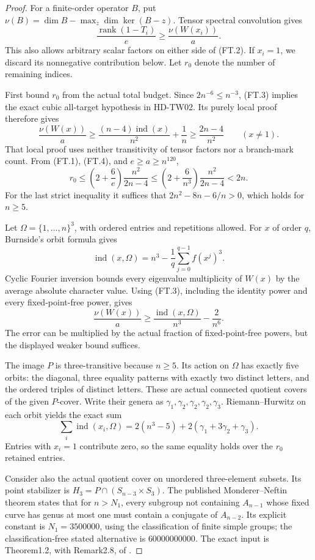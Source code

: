 \begin{proof}
For a finite-order operator \(B\), put
\(\nu(B)=\dim B-\max_z\dim\ker(B-z)\).
Tensor spectral convolution gives
\[
       \frac{\operatorname{rank}(1-T_i)}e
                   \ge\frac{\nu(W(x_i))}{a}.
       \tag{FT.4}
\]
This also allows arbitrary scalar factors on either side of (FT.2).
If \(x_i=1\), we discard its nonnegative contribution below.
Let \(r_0\) denote the number of remaining indices.

First bound \(r_0\) from the actual total budget.
Since \(2n^{-6}\le n^{-3}\), (FT.3) implies the exact cubic
all-target hypothesis in HD-TW02. Its purely local proof therefore gives
\[
 \frac{\nu(W(x))}{a}
 \ge \frac{(n-4)\operatorname{ind}(x)}{n^2}+\frac1n
 \ge \frac{2n-4}{n^2}
 \qquad(x\ne1).
 \tag{FT.5}
\]
That local proof uses neither transitivity of tensor factors nor a
branch-mark count. From (FT.1), (FT.4), and \(e\ge a\ge n^{120}\),
\[
 r_0\le
 \left(2+\frac6e\right)\frac{n^2}{2n-4}
 \le \left(2+\frac6{n^3}\right)\frac{n^2}{2n-4}<2n.
 \tag{FT.6}
\]
For the last strict inequality it suffices that
\(2n^2-8n-6/n>0\), which holds for \(n\ge5\).

Let \(\Omega=\{1,\ldots,n\}^3\), with ordered entries and repetitions
allowed. For \(x\) of order \(q\), Burnside's orbit formula gives
\[
 \operatorname{ind}(x,\Omega)
       =n^3-\frac1q\sum_{j=0}^{q-1}f(x^j)^3.
       \tag{FT.7}
\]
Cyclic Fourier inversion bounds every eigenvalue multiplicity of \(W(x)\)
by the average absolute character value. Using (FT.3), including the
identity power and every fixed-point-free power, gives
\[
 \frac{\nu(W(x))}{a}
    \ge\frac{\operatorname{ind}(x,\Omega)}{n^3}
                  -\frac2{n^6}.
 \tag{FT.8}
\]
The error can be multiplied by the actual fraction of fixed-point-free
powers, but the displayed weaker bound suffices.

The image \(P\) is three-transitive because \(n\ge5\).
Its action on \(\Omega\) has exactly five orbits: the diagonal,
three equality patterns with exactly two distinct letters, and
the ordered triples of distinct letters. These are actual connected
quotient covers of the given \(P\)-cover. Write their genera as
\(\gamma_1,\gamma_2,\gamma_2,\gamma_2,\gamma_3\).
Riemann--Hurwitz on each orbit yields the exact sum
\[
 \sum_i\operatorname{ind}(x_i,\Omega)
       =2(n^3-5)+2(\gamma_1+3\gamma_2+\gamma_3).
       \tag{FT.9}
\]
Entries with \(x_i=1\) contribute zero, so the same equality holds
over the \(r_0\) retained entries.

Consider also the actual quotient cover on unordered three-element
subsets. Its point stabilizer is
\(H_3=P\cap(S_{n-3}\times S_3)\).
The published Monderer--Neftin theorem states that for \(n>N_1\),
every subgroup not containing \(A_{n-1}\) whose fixed curve has
genus at most one must contain a conjugate of \(A_{n-2}\).
Its explicit constant is \(N_1=3500000\), using the classification
of finite simple groups; the classification-free stated alternative
is \(60000000000\).
The exact input is Theorem1.2, with Remark2.8, of
\cite{HD:MondererNeftin2022}.


\end{proof}
